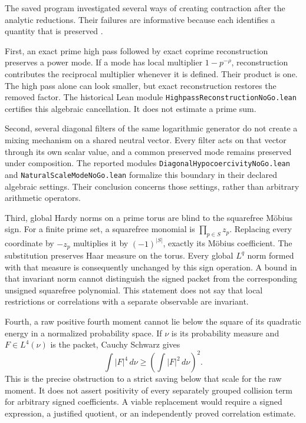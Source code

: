 The saved program investigated several ways of creating contraction after the analytic reductions. Their failures are informative because each identifies a quantity that is preserved \cite{KomorebiFinalGap,KomorebiBoundary}.

First, an exact prime high pass followed by exact coprime reconstruction preserves a power mode. If a mode has local multiplier \(1-p^{-\rho}\), reconstruction contributes the reciprocal multiplier whenever it is defined. Their product is one. The high pass alone can look smaller, but exact reconstruction restores the removed factor. The historical Lean module \texttt{HighpassReconstructionNoGo.lean} certifies this algebraic cancellation. It does not estimate a prime sum.

Second, several diagonal filters of the same logarithmic generator do not create a mixing mechanism on a shared neutral vector. Every filter acts on that vector through its own scalar value, and a common preserved mode remains preserved under composition. The reported modules \texttt{DiagonalHypocoercivityNoGo.lean} and \texttt{NaturalScaleModeNoGo.lean} formalize this boundary in their declared algebraic settings. Their conclusion concerns those settings, rather than arbitrary arithmetic operators.

Third, global Hardy norms on a prime torus are blind to the squarefree Möbius sign. For a finite prime set, a squarefree monomial is \(\prod_{p\in S}z_p\). Replacing every coordinate by \(-z_p\) multiplies it by \((-1)^{|S|}\), exactly its Möbius coefficient. The substitution preserves Haar measure on the torus. Every global \(L^q\) norm formed with that measure is consequently unchanged by this sign operation. A bound in that invariant norm cannot distinguish the signed packet from the corresponding unsigned squarefree polynomial. This statement does not say that local restrictions or correlations with a separate observable are invariant.

Fourth, a raw positive fourth moment cannot lie below the square of its quadratic energy in a normalized probability space. If \(\nu\) is its probability measure and \(F\in L^4(\nu)\) is the packet, Cauchy Schwarz gives
\[
\int |F|^4\,d\nu\ge\left(\int |F|^2\,d\nu\right)^2.
\]
This is the precise obstruction to a strict saving below that scale for the raw moment. It does not assert positivity of every separately grouped collision term for arbitrary signed coefficients. A viable replacement would require a signed expression, a justified quotient, or an independently proved correlation estimate.

